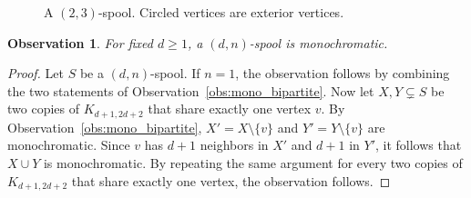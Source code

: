 \documentclass[a4paper,UKenglish,cleveref, autoref]{lipics-v2019}
\newtheorem{observation}{Observation}
\newcommand{\inners}{1.2pt}
\newcommand{\outers}{1pt}
\begin{document}
\begin{figure}[!htb]
    \centering
    \caption{\centering A $(2,3)$-spool. Circled vertices are exterior vertices.\label{fig:spool}}
\end{figure}

\begin{observation}
    For fixed $d\geq 1$, a $(d, n)$-spool is monochromatic.
\end{observation}




\begin{proof}
    Let $S$ be a $(d, n)$-spool.
    If $n=1$, the observation follows by combining the two statements of Observation~\ref{obs:mono_bipartite}.
    Now let $X, Y \subsetneq S$ be two copies of $K_{d+1,2d+2}$ that share exactly one vertex $v$.
    By Observation~\ref{obs:mono_bipartite}, $X' = X \setminus \{v\}$ and $Y' = Y \setminus \{v\}$ are monochromatic.
    Since $v$ has $d+1$ neighbors in $X'$ and $d+1$ in $Y'$, it follows that $X \cup Y$ is monochromatic. By repeating the same argument for every  two copies of $K_{d+1,2d+2}$ that share exactly one vertex, the observation follows.
\end{proof}
\end{document}
